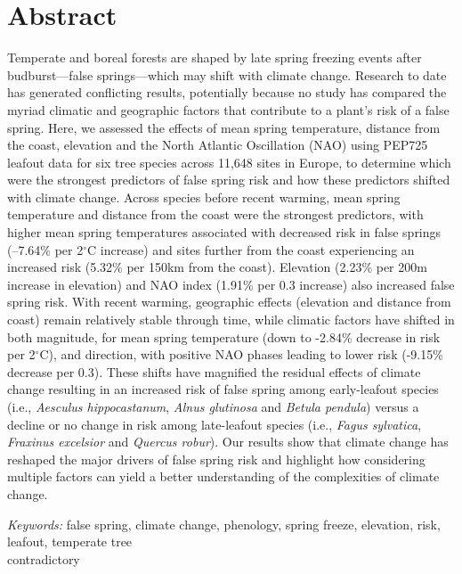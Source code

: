 \documentclass{article}\usepackage[]{graphicx}\usepackage[]{color}
\begin{document}
\section*{Abstract} %
Temperate and boreal forests are shaped by late spring freezing events after budburst---false springs---which may shift with climate change. Research to date has generated conflicting results, potentially because no study has compared the myriad climatic and geographic factors that contribute to a plant's risk of a false spring. Here, we assessed the effects of mean spring temperature, distance from the coast, elevation and the North Atlantic Oscillation (NAO) using PEP725 leafout data for six tree species across 11,648 sites in Europe, to determine which were the strongest predictors of false spring risk and how these predictors shifted with climate change. Across species before recent warming, mean spring temperature and distance from the coast were the strongest predictors, with higher mean spring temperatures associated with decreased risk in false springs (--7.64\% per 2$^{\circ}$C increase) and sites further from the coast experiencing an increased risk (5.32\% per 150km from the coast). Elevation (2.23\% per 200m increase in elevation) and NAO index (1.91\% per 0.3 increase) also increased false spring risk. With recent warming, geographic effects (elevation and distance from coast) remain relatively stable through time, while climatic factors have shifted in both magnitude, for mean spring temperature (down to -2.84\% decrease in risk per 2$^{\circ}$C), and direction, with positive NAO phases leading to lower risk (-9.15\% decrease per 0.3). These shifts have magnified the residual effects of climate change resulting in an increased risk of false spring among early-leafout species (i.e., \textit{Aesculus hippocastanum}, \textit{Alnus glutinosa} and \textit{Betula pendula}) versus a decline or no change in risk among late-leafout species (i.e., \textit{Fagus sylvatica}, \textit{Fraxinus excelsior} and \textit{Quercus robur}). Our results show that climate change has reshaped the major drivers of false spring risk and highlight how considering multiple factors can yield a better understanding of the complexities of climate change.

\vspace{2ex}
\textit{Keywords:} false spring, climate change, phenology, spring freeze, elevation, risk, leafout, temperate tree \\contradictory

\end{document}
